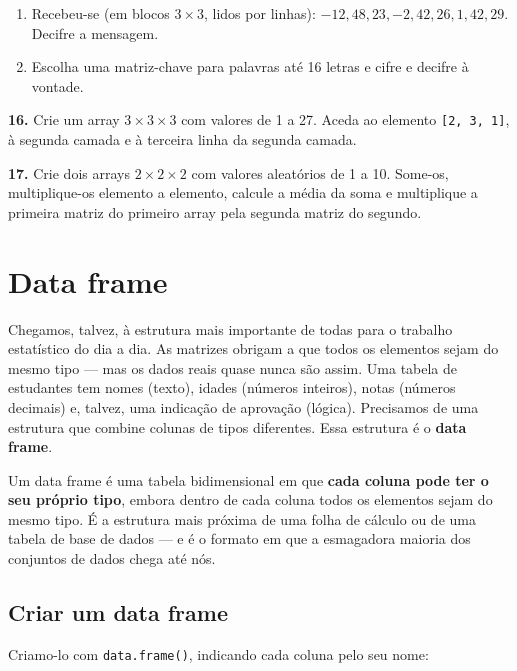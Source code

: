 \documentclass[
  portuguese,
  11pt,
  openany]{book}
\providecommand{\tightlist}{%
  \setlength{\itemsep}{0pt}\setlength{\parskip}{0pt}}
\begin{document}
\begin{enumerate}
\def\labelenumi{(\alph{enumi})}
\tightlist
\item
  Recebeu-se (em blocos \(3 \times 3\), lidos por linhas): \(-12, 48, 23, -2, 42,
  26, 1, 42, 29\). Decifre a mensagem.
\item
  Escolha uma matriz-chave para palavras até 16 letras e cifre e decifre à
  vontade.
\end{enumerate}

\textbf{16.} Crie um array \(3 \times 3 \times 3\) com valores de 1 a 27. Aceda ao
elemento \texttt{{[}2,\ 3,\ 1{]}}, à segunda camada e à terceira linha da segunda camada.

\textbf{17.} Crie dois arrays \(2 \times 2 \times 2\) com valores aleatórios de 1 a 10.
Some-os, multiplique-os elemento a elemento, calcule a média da soma e multiplique
a primeira matriz do primeiro array pela segunda matriz do segundo.

\section{Data frame}\label{data-frame}

Chegamos, talvez, à estrutura mais importante de todas para o trabalho
estatístico do dia a dia. As matrizes obrigam a que todos os elementos sejam do
mesmo tipo --- mas os dados reais quase nunca são assim. Uma tabela de estudantes
tem nomes (texto), idades (números inteiros), notas (números decimais) e, talvez,
uma indicação de aprovação (lógica). Precisamos de uma estrutura que combine
colunas de tipos diferentes. Essa estrutura é o \textbf{data frame}.

Um data frame é uma tabela bidimensional em que \textbf{cada coluna pode ter o seu
próprio tipo}, embora dentro de cada coluna todos os elementos sejam do mesmo
tipo. É a estrutura mais próxima de uma folha de cálculo ou de uma tabela de base
de dados --- e é o formato em que a esmagadora maioria dos conjuntos de dados chega
até nós.

\subsection{Criar um data frame}\label{criar-um-data-frame}

Criamo-lo com \texttt{data.frame()}, indicando cada coluna pelo seu nome:
\end{document}
